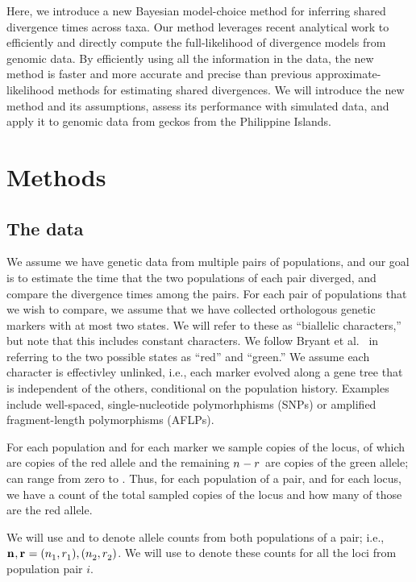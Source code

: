 Here, we introduce a new Bayesian model-choice method for inferring
shared divergence times across taxa.
Our method leverages recent analytical work \citep{Bryant2012} to efficiently
and directly compute the full-likelihood of divergence models from genomic
data.
By efficiently using all the information in the data, the new method is faster
and more accurate and precise than previous approximate-likelihood methods for
estimating shared divergences.
We will introduce the new method and its assumptions, assess its performance
with simulated data, and apply it to genomic data from geckos from the
Philippine Islands.


\section{Methods}

\subsection{The data}
We assume we have genetic data from multiple pairs of populations, and our goal
is to estimate the time that the two populations of each pair diverged, and
compare the divergence times among the pairs.
For each pair of populations that we wish to compare, we assume that we have
collected orthologous genetic markers with at most two states.
We will refer to these as ``biallelic characters,'' but note that this includes
constant characters.
We follow Bryant et al.\ \citeyear{Bryant2012} in referring to the two possible
states as ``red'' and ``green.''
We assume each character is effectivley unlinked, i.e., each marker evolved
along a gene tree that is independent of the others, conditional on the
population history.
Examples include well-spaced, single-nucleotide polymorhphisms (SNPs) or
amplified fragment-length polymorphisms (AFLPs).

For each population and for each marker we sample \allelecount
copies of the locus, \redallelecount of which are copies of the red
allele and the remaining $\allelecount - \redallelecount$ are
copies of the green allele;
\redallelecount can range from zero to \allelecount.
Thus, for each population of a pair, and for each locus, we have a count of the
total sampled copies of the locus and how many of those are the red allele.

We will use \leafallelecounts and \leafredallelecounts to denote allele counts
from both populations of a pair; i.e., 
$\leafallelecounts, \leafredallelecounts = (\allelecount[1], \redallelecount[1]), 
(\allelecount[2], \redallelecount[2])$.
We will use \comparisondata[i] to denote these counts for all the loci from
population pair $i$.


